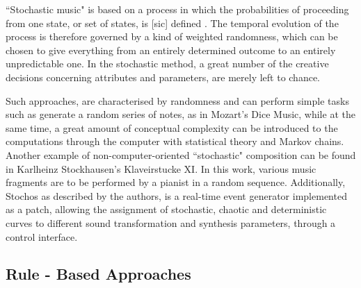         ``Stochastic music" is based on a process in which the probabilities of proceeding from one state, or set of states, is [sic] defined \cite{audibleDesign}. The temporal evolution of the process is therefore governed by a kind of weighted randomness, which can be chosen to give everything from an entirely determined outcome to an entirely unpredictable one. In the stochastic method, a great number of the creative decisions concerning attributes and parameters, are merely left to chance.

        Such approaches, are characterised by randomness and can perform simple tasks such as generate a random series of notes, as in Mozart's Dice Music, while at the same time, a great amount of conceptual complexity can be introduced to the computations through the computer with statistical theory and Markov chains. Another example of non-computer-oriented ``stochastic" composition can be found in Karlheinz Stockhausen's Klaveirstucke XI. In this work, various music fragments are to be performed by a pianist in a random sequence. Additionally, Stochos \cite{Stochos} as described by the authors, is a real-time event generator implemented as a patch, allowing the assignment of stochastic, chaotic and deterministic curves to different sound transformation and synthesis parameters, through a control interface.

    
        \subsection{Rule - Based Approaches} \label{subsec:rule_based}

